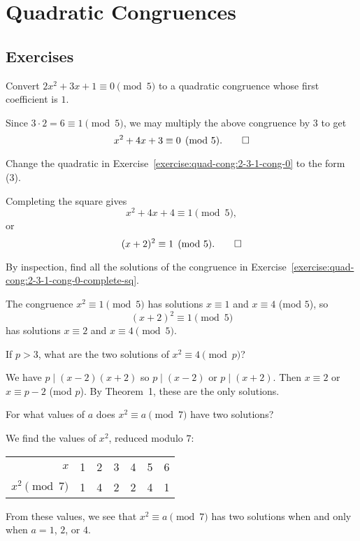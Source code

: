 \chapter{Quadratic Congruences}

\section{Exercises}

\label{exercise:quad-cong:2-3-1-cong-0}
Convert $2x^2 + 3x + 1 \equiv 0\pmod5$ to a quadratic congruence whose
first coefficient is $1$.
\begin{solution}
  Since $3\cdot2 = 6\equiv1\pmod5$, we may multiply the above
  congruence by $3$ to get
  \begin{equation*}
    x^2 + 4x + 3\equiv0\pmod5. \qedhere
  \end{equation*}
\end{solution}

\label{exercise:quad-cong:2-3-1-cong-0-complete-sq}
Change the quadratic in Exercise~\ref{exercise:quad-cong:2-3-1-cong-0}
to the form (3).
\begin{solution}
  Completing the square gives
  \begin{equation*}
    x^2 + 4x + 4 \equiv 1\pmod5,
  \end{equation*}
  or
  \begin{equation*}
    (x + 2)^2 \equiv 1\pmod5. \qedhere
  \end{equation*}
\end{solution}

 By inspection, find all the solutions of the congruence in
Exercise~\ref{exercise:quad-cong:2-3-1-cong-0-complete-sq}.
\begin{solution}
  The congruence $x^2\equiv1\pmod5$ has solutions $x\equiv1$ and
  $x\equiv4$ (mod $5$), so
  \begin{equation*}
    (x + 2)^2\equiv1\pmod5
  \end{equation*}
  has solutions $x\equiv2$ and $x\equiv4\pmod5$.
\end{solution}

 If $p > 3$, what are the two solutions of
$x^2\equiv4\pmod{p}$?
\begin{solution}
  We have $p\mid(x-2)(x+2)$ so $p\mid(x-2)$ or $p\mid(x+2)$. Then
  $x\equiv2$ or $x\equiv p-2$ (mod $p$). By Theorem~1, these are the
  only solutions.
\end{solution}

 For what values of $a$ does $x^2\equiv a\pmod7$ have two
solutions?
\begin{solution}
  We find the values of $x^2$, reduced modulo $7$:
  \begin{center}
    \begin{tabular}{r|cccccc}
      $x$ & 1 & 2 & 3 & 4 & 5 & 6 \\
      $x^2\pmod7$ & 1 & 4 & 2 & 2 & 4 & 1
    \end{tabular}
  \end{center}
  From these values, we see that $x^2\equiv a\pmod7$ has two solutions
  when and only when $a = 1$, $2$, or $4$.
\end{solution}

